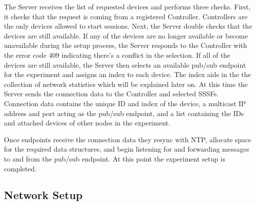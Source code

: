 \documentclass[letterpaper,twocolumn,10pt]{article}
\begin{document}
The Server receives the list of requested devices and performs three checks. First, it checks that the request is coming from a registered Controller. Controllers are the only devices allowed to start sessions. Next, the Server double checks that the devices are still available. If any of the devices are no longer available or become unavailable during the setup process, the Server responds to the Controller with the error code 409 indicating there's a conflict in the selection. If all of the devices are still available, the Server then selects an available pub/sub endpoint for the experiment and assigns an index to each device. The index aids in the the collection of network statistics which will be explained later on. At this time the Server sends the connection data to the Controller and selected SSSFs. Connection data contains the unique ID and index of the device, a multicast IP address and port acting as the pub/sub endpoint, and a list containing the IDs and attached devices of other nodes in the experiment.

Once endpoints receive the connection data they resync with NTP, allocate space for the required data structures, and begin listening for and forwarding messages to and from the pub/sub endpoint. At this point the experiment setup is completed.

\subsection{Network Setup}
\end{document}
